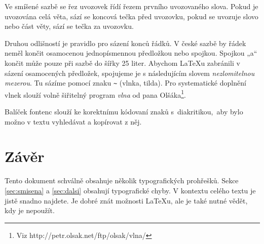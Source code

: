 \documentclass[a4paper,10pt,twocolumn]{article}
\begin{document}
Ve smíšené sazbě se řez uvozovek řídí řezem prvního uvozovaného slova. Pokud je uvozována celá věta, sází se koncová tečka před uvozovku, pokud se uvozuje slovo nebo část věty, sází se tečka za uvozovku.

Druhou odlišností je pravidlo pro sázení konců řádků. V české sazbě by řádek neměl končit osamocenou jednopísmennou předložkou nebo spojkou. Spojkou „a“ končit může pouze při sazbě do šířky 25 liter. Abychom LaTeXu zabránili v sázení osamocených předložek, spojujeme je s následujícím slovem \emph{nezlomitelnou mezerou}. Tu sázíme pomocí znaku \verb|~| (vlnka, tilda). Pro systematické doplnění vlnek slouží volně šiřitelný program \emph{vlna} od pana Olšáka\footnote{Viz {\ttfamily http://petr.olsak.net/ftp/olsak/vlna/}}.

Balíček {\ttfamily fontenc} slouží ke korektnímu kódovaní znaků s~diakritikou,~aby bylo možno v textu vyhledávat a kopírovat z něj.

\section{Závěr}
Tento dokument schválně obsahuje několik typografických prohřešků. Sekce \ref{sec:smisena} a \ref{sec:dalsi} obsahují typografické chyby. V kontextu celého textu je jistě snadno najdete. Je dobré znát možnosti LaTeXu, ale je také nutné vědět, kdy je nepoužít.
\end{document}
